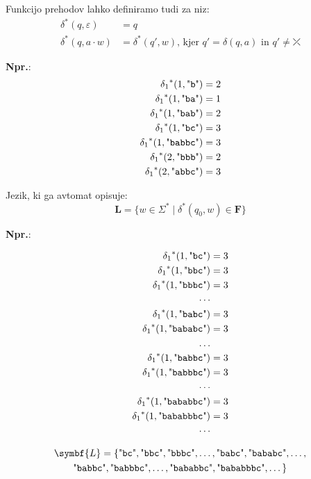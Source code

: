 \documentclass{report}
\newcommand{\Ex}{\textbf{Npr.}:\ }
\newcommand{\Str}[1]{\text{\textquotedbl\texttt{#1}\textquotedbl}}
\newcommand{\Seq}{\cdot}
\newcommand{\Kleene}[1]{{#1}^\ast}
\newcommand{\Err}{\rdiagovfdiag}
\newcommand{\Set}[1]{\symbf{#1}}
\begin{document}
Funkcijo prehodov lahko definiramo tudi za niz:
\begin{align*} %
  \Kleene{\delta}(q, \varepsilon) &= q\\
  \Kleene{\delta}(q, a \Seq w) &= \Kleene{\delta}(q', w) \text{, kjer } q' = \delta(q, a) \text{ in } q' \neq \Err
\end{align*}

\Ex
\begin{align*}
  \Kleene{\delta_1}(1, \Str{b}) &= 2 \\
  \Kleene{\delta_1}(1, \Str{ba}) &= 1 \\
  \Kleene{\delta_1}(1, \Str{bab}) &= 2 \\
  \Kleene{\delta_1}(1, \Str{bc}) &= 3 \\
  \Kleene{\delta_1}(1, \Str{babbc}) &= 3 \\
  \Kleene{\delta_1}(2, \Str{bbb}) &= 2 \\
  \Kleene{\delta_1}(2, \Str{abbc}) &= 3
\end{align*}

Jezik, ki ga avtomat opisuje:
\begin{equation*}
  \Set{L} = \{w \in \Kleene{\Sigma} \mid \Kleene{\delta}(q_0, w) \in \Set{F}\}
\end{equation*}

\Ex

\begin{align*}
  \Kleene{\delta_1}(1, \Str{bc}) &= 3 \\
  \Kleene{\delta_1}(1, \Str{bbc}) &= 3 \\
  \Kleene{\delta_1}(1, \Str{bbbc}) &= 3 \\
  \cdots \\
  \Kleene{\delta_1}(1, \Str{babc}) &= 3 \\
  \Kleene{\delta_1}(1, \Str{bababc}) &= 3 \\
  \ldots \\
  \Kleene{\delta_1}(1, \Str{babbc}) &= 3 \\
  \Kleene{\delta_1}(1, \Str{babbbc}) &= 3 \\
  \cdots \\
  \Kleene{\delta_1}(1, \Str{bababbc}) &= 3 \\
  \Kleene{\delta_1}(1, \Str{bababbbc}) &= 3 \\
  \cdots \\
\end{align*}

\begin{multline*}
  \Set{L} = \{ \Str{bc}, \Str{bbc}, \Str{bbbc}, \ldots, \Str{babc}, \Str{bababc}, \ldots,\\
  \Str{babbc},  \Str{babbbc}, \ldots, \Str{bababbc}, \Str{bababbbc}, \dots \}
\end{multline*}
\end{document}
